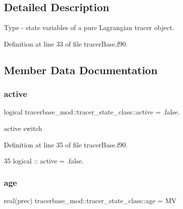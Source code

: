 \subsection{Detailed Description}
Type -\/ state variables of a pure Lagrangian tracer object. 

Definition at line 33 of file tracer\+Base.\+f90.



\subsection{Member Data Documentation}
\mbox{\label{structtracerbase__mod_1_1tracer__state__class_a40841af58b7434716bc8d87bf1b3b694}} 
\subsubsection{\texorpdfstring{active}{active}}
{\footnotesize\ttfamily logical tracerbase\+\_\+mod\+::tracer\+\_\+state\+\_\+class\+::active = .false.\hspace{0.3cm}{\ttfamily [private]}}



active switch 



Definition at line 35 of file tracer\+Base.\+f90.


\begin{DoxyCode}
35         \textcolor{keywordtype}{logical} :: active = .false.             
\end{DoxyCode}
\mbox{\label{structtracerbase__mod_1_1tracer__state__class_aabf14569a79276d6cdd0f0a537cfb046}} 
\subsubsection{\texorpdfstring{age}{age}}
{\footnotesize\ttfamily real(prec) tracerbase\+\_\+mod\+::tracer\+\_\+state\+\_\+class\+::age = MV\hspace{0.3cm}{\ttfamily [private]}}



